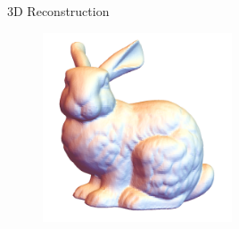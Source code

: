 \documentclass{beamer}
\begin{document}
\begin{frame}{3D Reconstruction}
    \begin{figure}[H]
      \centering
        \includegraphics[width=0.5\textwidth]{3D_rabit.png}
      \label{fig:f2}
    \end{figure}
\end{frame}
\end{document}
